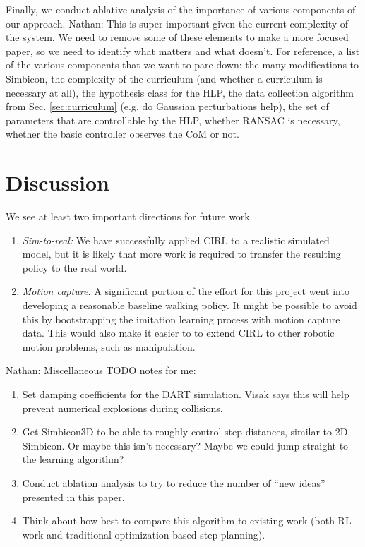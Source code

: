 \documentclass[a4paper]{article}
\newcommand{\nhatch}[1]{{\leavevmode\color{blue} Nathan: #1}}
\begin{document}
Finally, we conduct ablative analysis of the importance of various components of our approach.
\nhatch{This is super important given the current complexity of the system. We need to remove some of these elements to make a more focused paper, so we need to identify what matters and what doesn't.
For reference, a list of the various components that we want to pare down: the many modifications to Simbicon, the complexity of the curriculum (and whether a curriculum is necessary at all), the hypothesis class for the HLP, the data collection algorithm from Sec. \ref{sec:curriculum} (e.g. do Gaussian perturbations help), the set of parameters that are controllable by the HLP, whether RANSAC is necessary, whether the basic controller observes the CoM or not.}

\section{Discussion}

We see at least two important directions for future work.
\begin{enumerate}
  \item \emph{Sim-to-real:}
    We have successfully applied CIRL to a realistic simulated model, but it is likely that more work is required to transfer the resulting policy to the real world.
  \item \emph{Motion capture:}
    A significant portion of the effort for this project went into developing a reasonable baseline walking policy.
    It might be possible to avoid this by bootstrapping the imitation learning process with motion capture data.
    This would also make it easier to to extend CIRL to other robotic motion problems, such as manipulation.
\end{enumerate}

\nhatch{Miscellaneous TODO notes for me:
\begin{enumerate}
  \item Set damping coefficients for the DART simulation. Visak says this will help prevent numerical explosions during collisions.
  \item Get Simbicon3D to be able to roughly control step distances, similar to 2D Simbicon. Or maybe this isn't necessary? Maybe we could jump straight to the learning algorithm?
  \item Conduct ablation analysis to try to reduce the number of ``new ideas'' presented in this paper.
  \item Think about how best to compare this algorithm to existing work (both RL work and traditional optimization-based step planning).
\end{enumerate}
}



\end{document}
